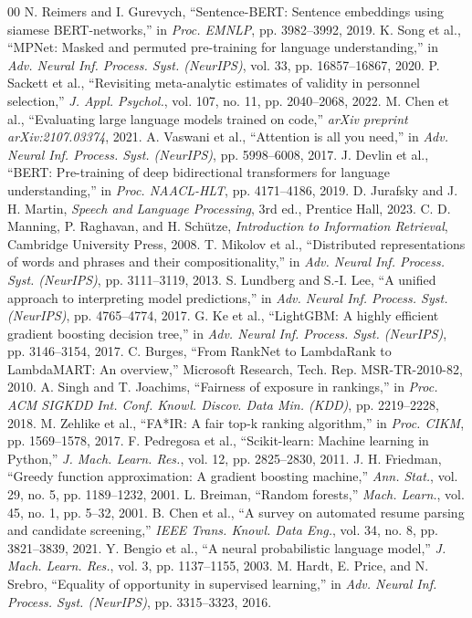 \documentclass[conference]{IEEEtran}
\begin{document}
\begin{thebibliography}{00}
 N. Reimers and I. Gurevych, ``Sentence-BERT: Sentence embeddings using siamese BERT-networks,'' in \textit{Proc. EMNLP}, pp. 3982--3992, 2019.
 K. Song et al., ``MPNet: Masked and permuted pre-training for language understanding,'' in \textit{Adv. Neural Inf. Process. Syst. (NeurIPS)}, vol. 33, pp. 16857--16867, 2020.
 P. Sackett et al., ``Revisiting meta-analytic estimates of validity in personnel selection,'' \textit{J. Appl. Psychol.}, vol. 107, no. 11, pp. 2040--2068, 2022.
 M. Chen et al., ``Evaluating large language models trained on code,'' \textit{arXiv preprint arXiv:2107.03374}, 2021.
 A. Vaswani et al., ``Attention is all you need,'' in \textit{Adv. Neural Inf. Process. Syst. (NeurIPS)}, pp. 5998--6008, 2017.
 J. Devlin et al., ``BERT: Pre-training of deep bidirectional transformers for language understanding,'' in \textit{Proc. NAACL-HLT}, pp. 4171--4186, 2019.
 D. Jurafsky and J. H. Martin, \textit{Speech and Language Processing}, 3rd ed., Prentice Hall, 2023.
 C. D. Manning, P. Raghavan, and H. Schütze, \textit{Introduction to Information Retrieval}, Cambridge University Press, 2008.
 T. Mikolov et al., ``Distributed representations of words and phrases and their compositionality,'' in \textit{Adv. Neural Inf. Process. Syst. (NeurIPS)}, pp. 3111--3119, 2013.
 S. Lundberg and S.-I. Lee, ``A unified approach to interpreting model predictions,'' in \textit{Adv. Neural Inf. Process. Syst. (NeurIPS)}, pp. 4765--4774, 2017.
 G. Ke et al., ``LightGBM: A highly efficient gradient boosting decision tree,'' in \textit{Adv. Neural Inf. Process. Syst. (NeurIPS)}, pp. 3146--3154, 2017.
 C. Burges, ``From RankNet to LambdaRank to LambdaMART: An overview,'' Microsoft Research, Tech. Rep. MSR-TR-2010-82, 2010.
 A. Singh and T. Joachims, ``Fairness of exposure in rankings,'' in \textit{Proc. ACM SIGKDD Int. Conf. Knowl. Discov. Data Min. (KDD)}, pp. 2219--2228, 2018.
 M. Zehlike et al., ``FA*IR: A fair top-k ranking algorithm,'' in \textit{Proc. CIKM}, pp. 1569--1578, 2017.
 F. Pedregosa et al., ``Scikit-learn: Machine learning in Python,'' \textit{J. Mach. Learn. Res.}, vol. 12, pp. 2825--2830, 2011.
 J. H. Friedman, ``Greedy function approximation: A gradient boosting machine,'' \textit{Ann. Stat.}, vol. 29, no. 5, pp. 1189--1232, 2001.
 L. Breiman, ``Random forests,'' \textit{Mach. Learn.}, vol. 45, no. 1, pp. 5--32, 2001.
 B. Chen et al., ``A survey on automated resume parsing and candidate screening,'' \textit{IEEE Trans. Knowl. Data Eng.}, vol. 34, no. 8, pp. 3821--3839, 2021.
 Y. Bengio et al., ``A neural probabilistic language model,'' \textit{J. Mach. Learn. Res.}, vol. 3, pp. 1137--1155, 2003.
 M. Hardt, E. Price, and N. Srebro, ``Equality of opportunity in supervised learning,'' in \textit{Adv. Neural Inf. Process. Syst. (NeurIPS)}, pp. 3315--3323, 2016.
\end{thebibliography}
\end{document}
